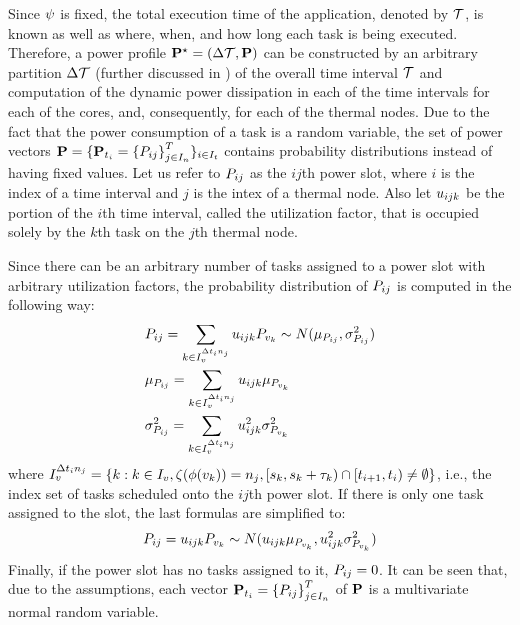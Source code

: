 Since $\psi$ is fixed, the total execution time of the application, denoted by $\mathcal{T}$, is known as well as where, when, and how long each task is being executed. Therefore, a power profile $\mathbf{P}^\star = (\Delta \mathcal{T}, \mathbf{P})$ can be constructed by an arbitrary partition $\Delta \mathcal{T}$ (further discussed in ) of the overall time interval $\mathcal{T}$ and computation of the dynamic power dissipation in each of the time intervals for each of the cores, and, consequently, for each of the thermal nodes. Due to the fact that the power consumption of a task is a random variable, the set of power vectors $\mathbf{P} = \{ \mathbf{P}_{t_i} = \left\{ P_{i j} \right\}_{j \in I_n}^T \}_{i \in I_t}$ contains probability distributions instead of having fixed values. Let us refer to $P_{ij}$ as the $ij$th power slot, where $i$ is the index of a time interval and $j$ is the intex of a thermal node. Also let $u_{ijk}$ be the portion of the $i$th time interval, called the utilization factor, that is occupied solely by the $k$th task on the $j$th thermal node.

Since there can be an arbitrary number of tasks assigned to a power slot with arbitrary utilization factors, the probability distribution of $P_{ij}$ is computed in the following way:
\begin{align*}
  & P_{ij} = \sum_{k \in I_v^{\Delta t_i n_j}} u_{ijk} P_{v_k} \sim N(\mu_{P_{ij}}, \sigma_{P_{ij}}^2) \\
  & \mu_{P_{ij}} = \sum_{k \in I_v^{\Delta t_i n_j}} u_{ijk} \mu_{P_{v_k}} \\
  & \sigma_{P_{ij}}^2 = \sum_{k \in I_v^{\Delta t_i n_j}} u_{ijk}^2 \sigma_{P_{v_k}}^2
\end{align*}
where $I_v^{\Delta t_i n_j} = \{ k: k \in I_v, \zeta(\phi(v_k)) = n_j, [s_k, s_k + \tau_k) \cap [t_{i + 1}, t_i) \neq \emptyset \}$, i.e., the index set of tasks scheduled onto the $ij$th power slot. If there is only one task assigned to the slot, the last formulas are simplified to:
\[
  P_{ij} = u_{ijk} P_{v_k} \sim N(u_{ijk} \mu_{P_{v_k}}, u_{ijk}^2 \sigma_{P_{v_k}}^2)
\]
Finally, if the power slot has no tasks assigned to it, $P_{ij} = 0$. It can be seen that, due to the assumptions, each vector $\mathbf{P}_{t_i} = \left\{P_{ij}\right\}_{j \in I_n}^T$ of $\mathbf{P}$ is a multivariate normal random variable.


